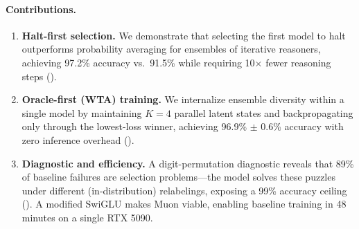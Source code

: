 \paragraph{Contributions.}
\begin{enumerate}
  \item \textbf{Halt-first selection.} We demonstrate that selecting the first
    model to halt outperforms probability averaging for ensembles of iterative
    reasoners, achieving 97.2\% accuracy vs.\ 91.5\% while requiring
    10$\times$ fewer reasoning steps ().
  \item \textbf{Oracle-first (WTA) training.} We internalize ensemble
    diversity within a single model by maintaining $K{=}4$ parallel latent
    states and backpropagating only through the lowest-loss winner, achieving
    96.9\% $\pm$ 0.6\% accuracy with zero inference overhead ().
  \item \textbf{Diagnostic and efficiency.} A digit-permutation diagnostic
    reveals that 89\% of baseline failures are selection problems---the model
    solves these puzzles under different (in-distribution) relabelings,
    exposing a 99\% accuracy ceiling ().
    A modified SwiGLU makes Muon viable, enabling baseline training in
    48 minutes on a single RTX 5090.
\end{enumerate}
